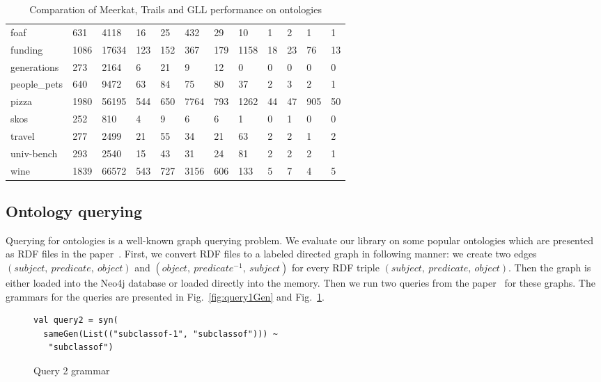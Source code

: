 \begin{table*}[t]
\begin{tabular}{|l|l|lllll|lllll|}
foaf                        & 631  & 4118  & 16  & 25  & 432  & 29  & 10   & 1  & 2  & 1   & 1 \\
funding                     & 1086 & 17634 & 123 & 152 & 367  & 179 & 1158 & 18 & 23 & 76  & 13 \\
generations                 & 273  & 2164  & 6   & 21  & 9    & 12  & 0    & 0  & 0  & 0   & 0 \\
people\_pets                & 640  & 9472  & 63  & 84  & 75   & 80  & 37   & 2  & 3  & 2   & 1 \\
pizza                       & 1980 & 56195 & 544 & 650 & 7764 & 793 & 1262 & 44 & 47 & 905 & 50 \\
skos                        & 252  & 810   & 4   & 9   & 6    & 6   & 1    & 0  & 1  & 0   & 0 \\
travel                      & 277  & 2499  & 21  & 55  & 34   & 21  & 63   & 2  & 2  & 1   & 2 \\
univ-bench                  & 293  & 2540  & 15  & 43  & 31   & 24  & 81   & 2  & 2  & 2   & 1 \\
wine                        & 1839 & 66572 & 543 & 727 & 3156 & 606 & 133  & 5  & 7   & 4   & 5 \\
\hline
\end{tabular}
\caption{Comparation of Meerkat, Trails and GLL performance on ontologies}
\label{table:rdfs}
\end{table*}


\subsection{Ontology querying}
\label{sec:ontology}

Querying for ontologies is a well-known graph querying problem. We evaluate our library on some popular ontologies which are presented as RDF files in the paper~\cite{CFGonRDF}. 
First, we convert RDF files to a labeled directed graph in following manner: we create two edges $(subject,\ predicate,\ object)$ and $(object,\ predicate^{-1},\ subject)$ for every RDF triple $(subject,\ predicate,\ object)$. Then the graph is either loaded into the Neo4j database or loaded directly into the memory. 
Then we run two queries from the paper~\cite{GrigorevR16} for these graphs. The grammars for the queries are presented in Fig.~\ref{fig:query1Gen} and Fig.~\ref{fig:query2Gen}.

\begin{figure}[h]
\begin{lstlisting}
val query2 = syn(
  sameGen(List(("subclassof-1", "subclassof"))) ~
   "subclassof")
\end{lstlisting}
\caption{Query 2 grammar}
\label{fig:query2Gen}
\end{figure}

